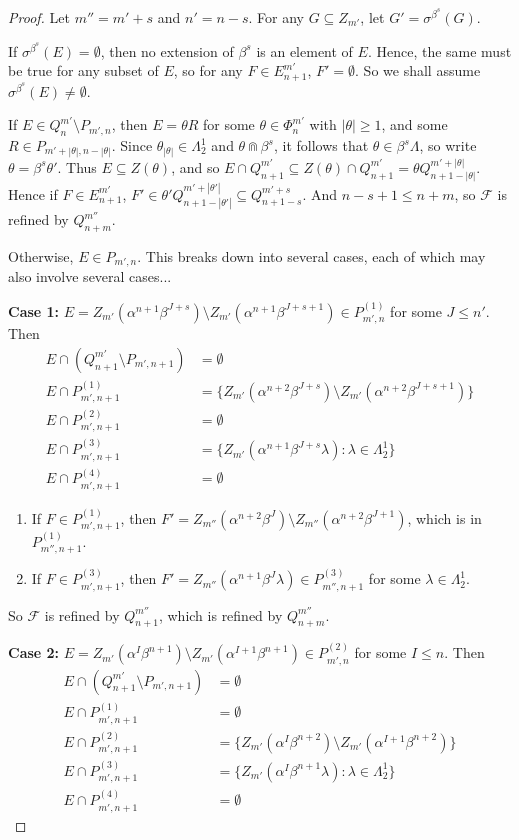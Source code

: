 \documentclass[12pt]{amsart}
\newcommand{\sm}{\setminus}
\newcommand{\sse}{\subseteq}
\newcommand{\mc}[1]{\mathcal{#1}}
\newcommand{\emp}{\emptyset}
\newcommand{\al}{\alpha}
\newcommand{\be}{\beta}
\renewcommand{\th}{\theta}
\newcommand{\la}{\lambda}
\newcommand{\La}{\Lambda}
\newcommand{\si}{\sigma}
\theoremstyle{plain} %
\theoremstyle{definition} %
\begin{document}
\begin{proof}
    Let $m'' = m'+s$ and $n' =n-s$. For any $G \sse Z_{m'}$, let $G' = \si^{\be^s}(G)$.

    If $\si^{\be^s}(E) = \emp$, then no extension of $\be^s$ is an element of $E$. Hence, the same must be true for any subset of $E$, so for any $F \in E_{n+1}^{m'}$, $F' = \emp$. So we shall assume $\si^{\be^s}(E) \neq \emp$.
    
    If $E \in Q^{m'}_n \sm P_{m', n}$, then $E = \th R$ for some $\th \in \Phi_n^{m'}$ with $|\th| \ge 1$, and some $R \in P_{m'+|\th|, n-|\th|}$. Since $\th_{|\th|} \in \La_2^1$ and $\th \Cap \be^s$, it follows that $\th \in \be^s \La$, so write $\th = \be^s \th'$. Thus $E \sse Z(\th)$, and so $E \cap Q_{n+1}^{m'} \sse Z(\th) \cap Q_{n+1}^{m'} = \th Q_{n+1 - |\th|}^{m'+|\th|}$. Hence if $F \in E^{m'}_{n+1}$, $F' \in \th' Q_{n+1-|\th'|}^{m'+|\th'|} \sse Q_{n+1-s}^{m'+s}$. And $n-s+1 \leq n+m$, so $\mc{F}$ is refined by $Q_{n+m}^{m''}$.


    Otherwise, $E \in P_{m',n}$. This breaks down into several cases, each of which may also involve several cases...

    \textbf{Case 1:} $E = Z_{m'}(\al^{n+1}\be^{J+s}) \sm Z_{m'}(\al^{n+1}\be^{J+s+1}) \in P_{m',n}^{(1)}$ for some $J \leq n'$. Then
    \begin{align*}
        E \cap (Q^{m'}_{n+1} \sm P_{m', n+1}) &= \emp\\
        E \cap P^{(1)}_{m',n+1} &= \{ Z_{m'}(\al^{n+2}\be^{J+s}) \sm Z_{m'}(\al^{n+2} \be^{J+s+1}) \}\\
        E \cap P^{(2)}_{m',n+1} &= \emp\\
        E \cap P^{(3)}_{m',n+1} &= \{Z_{m'}(\al^{n+1}\be^{J+s} \la) : \la \in \La_2^1\} \\
        E \cap P^{(4)}_{m',n+1} &= \emp
    \end{align*}
    \begin{enumerate}
        \item If $F \in P_{m', n+1}^{(1)}$, then $F' = Z_{m''}(\al^{n+2} \be^{J}) \sm Z_{m''}(\al^{n+2}\be^{J+1})$, which is in $P_{m'',n+1}^{(1)}$.

    \item If $F \in P^{(3)}_{m',n+1}$, then $F'= Z_{m''}(\al^{n+1}\be^{J}\la) \in P^{(3)}_{m'',n+1}$ for some $\la \in \La_2^1$.
    \end{enumerate}
    So $\mc{F}$ is refined by $Q_{n+1}^{m''}$, which is refined by $Q_{n+m}^{m''}$.

    \textbf{Case 2:} $E = Z_{m'}(\al^{I}\be^{n+1}) \sm Z_{m'}(\al^{I+1}\be^{n+1}) \in P_{m',n}^{(2)}$ for some $I \leq n$. Then
    \begin{align*}
        E \cap (Q^{m'}_{n+1} \sm P_{m', n+1}) &= \emp\\
        E \cap P^{(1)}_{m',n+1} &= \emp\\
        E \cap P^{(2)}_{m',n+1} &= \{Z_{m'}(\al^I\be^{n+2}) \sm Z_{m'}(\al^{I+1}\be^{n+2})\} \\
        E \cap P^{(3)}_{m',n+1} &= \{ Z_{m'}(\al^{I}\be^{n+1} \la) : \la \in \La_2^1\} \\
        E \cap P^{(4)}_{m',n+1} &= \emp
    \end{align*}


\end{proof}
\end{document}
